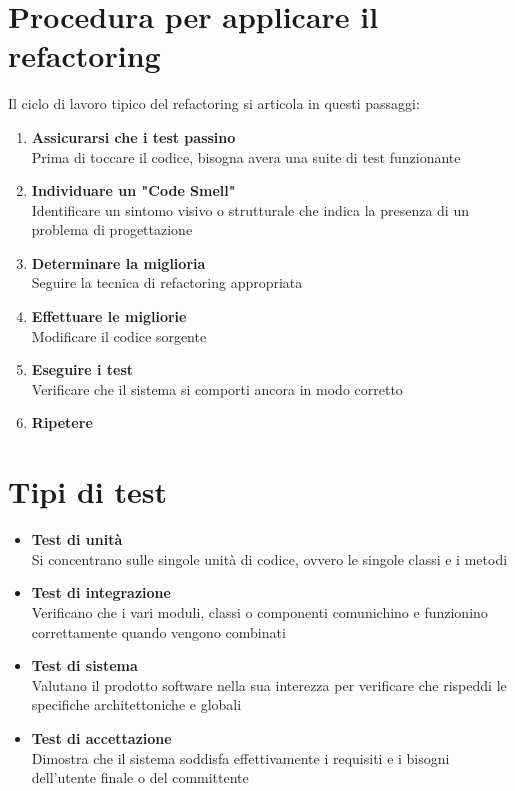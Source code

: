 \section{Procedura per applicare il refactoring}
Il ciclo di lavoro tipico del refactoring si articola in questi passaggi:
\begin{enumerate}
    \item \textbf{Assicurarsi che i test passino}\\
    Prima di toccare il codice, bisogna avera una suite di test funzionante
    \item \textbf{Individuare un "Code Smell"}\\
    Identificare un sintomo visivo o strutturale che indica la presenza di un problema di progettazione
    \item \textbf{Determinare la miglioria}\\
    Seguire la tecnica di refactoring appropriata
    \item \textbf{Effettuare le migliorie}\\
    Modificare il codice sorgente
    \item \textbf{Eseguire i test}\\
    Verificare che il sistema si comporti ancora in modo corretto
    \item \textbf{Ripetere}
\end{enumerate}

\section{Tipi di test}
\begin{itemize}
    \item \textbf{Test di unità}\\
    Si concentrano sulle singole unità di codice, ovvero le singole classi e i metodi
    \item \textbf{Test di integrazione}\\
    Verificano che i vari moduli, classi o componenti comunichino e funzionino correttamente quando vengono combinati
    \item \textbf{Test di sistema}\\
    Valutano il prodotto software nella sua interezza per verificare che rispeddi le specifiche architettoniche e globali
    \item \textbf{Test di accettazione}\\
    Dimostra che il sistema soddisfa effettivamente i requisiti e i bisogni dell'utente finale o del committente
\end{itemize}


